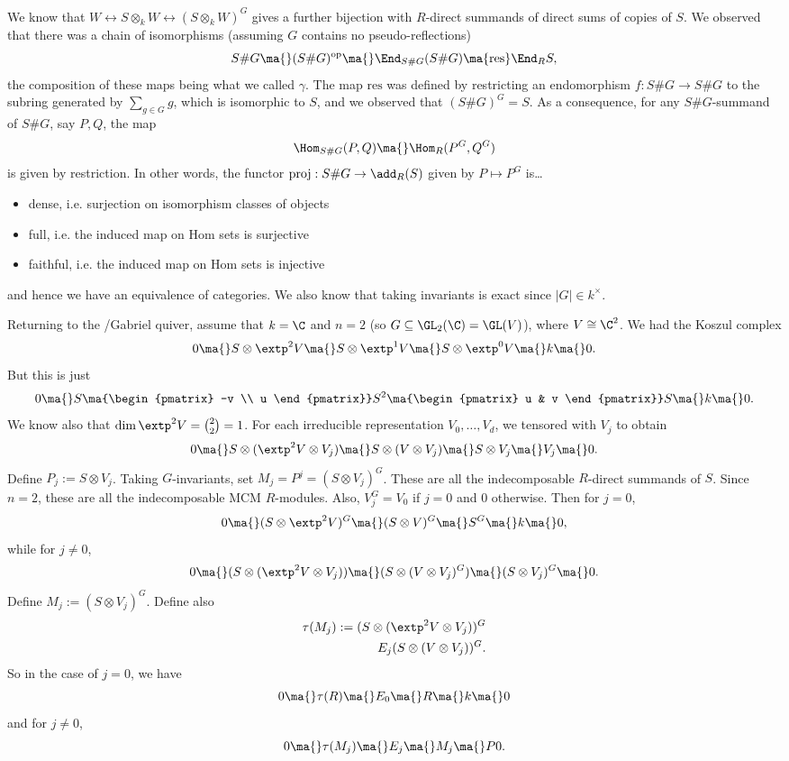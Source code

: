 We know that $W \leftrightarrow S \otimes_k W \leftrightarrow (S \otimes_k W)^G$ gives a further bijection with $R$-direct summands of direct sums of copies of $S$. We observed that there was a chain of isomorphisms (assuming $G$ contains no pseudo-reflections)
	\[
	S\#G \ma{} (S\#G)^{\text{op}} \ma{} \End_{S\#G}(S\#G) \ma{\text{res}} \End_R S,
	\]
the composition of these maps being what we called $\gamma$. The map $\text{res}$ was defined by restricting an endomorphism $f: S\#G \to S\#G$ to the subring generated by $\sum_{g \in G} g$, which is isomorphic to $S$, and we observed that $(S\#G)^G= S$. As a consequence, for any $S\#G$-summand of $S\#G$, say $P,Q$, the map
	\[
	\Hom_{S\#G}(P,Q) \ma{} \Hom_R(P^G,Q^G)
	\]
is given by restriction. In other words, the functor $\text{proj}: S\#G \to \add_R(S)$ given by $P \mapsto P^G$ is\dots
	\begin{itemize}
	\item dense, i.e. surjection on isomorphism classes of objects
	\item full, i.e. the induced map on Hom sets is surjective
	\item faithful, i.e. the induced map on Hom sets is injective
	\end{itemize}
and hence we have an equivalence of categories. We also know that taking invariants is exact since $|G| \in k^\times$. 


Returning to the \mc/Gabriel quiver, assume that $k= \C$ and $n=2$ (so $G \subseteq \GL_2(\C)= \GL(V)$), where $V \cong \C^2$. We had the Koszul complex
	\[
	0 \ma{} S \otimes \extp^2 V \ma{} S \otimes \extp^1 V \ma{} S \otimes \extp^0 V \ma{} k \ma{} 0.
	\]
But this is just
	\[
	0 \ma{} S \ma{\begin{pmatrix} -v \\ u \end{pmatrix}} S^2 \ma{\begin{pmatrix} u & v \end{pmatrix}} S \ma{} k \ma{} 0.
	\]
We know also that $\dim \extp^2 V= \binom{2}{2}=1$. For each irreducible representation $V_0, \ldots, V_d$, we tensored with $V_j$ to obtain
	\[
	0 \ma{} S \otimes (\extp^2 V \otimes V_j) \ma{} S \otimes (V \otimes V_j) \ma{} S \otimes V_j \ma{} V_j \ma{}0.
	\]
Define $P_j:= S \otimes V_j$. Taking $G$-invariants, set $M_j= P^j= (S \otimes V_j)^G$. These are all the indecomposable $R$-direct summands of $S$. Since $n=2$, these are all the indecomposable MCM $R$-modules. Also, $V_j^G= V_0$ if $j=0$ and 0 otherwise. Then for $j=0$,
	\[
	0 \ma{} (S \otimes \extp^2 V)^G \ma{} (S \otimes V)^G \ma{} S^G \ma{} k \ma{} 0,
	\]
while for $j \neq 0$,	
	\[
	0 \ma{} (S \otimes (\extp^2 V \otimes V_j)) \ma{} (S \otimes (V \otimes V_j)^G) \ma{} (S \otimes V_j)^G \ma{} 0.
	\]
Define $M_j:= (S \otimes V_j)^G$. Define also
	\[
	\begin{split}
	\tau(M_j):= (S \otimes (\extp^2 V \otimes V_j))^G \\
	E_j(S \otimes (V \otimes V_j))^G.
	\end{split}
	\]
So in the case of $j=0$, we have
	\[
	0 \ma{} \tau(R) \ma{} E_0 \ma{} R \ma{} k \ma{} 0
	\]
and for $j \neq 0$,
	\[
	0 \ma{} \tau(M_j) \ma{} E_j \ma{} M_j \ma{} P 0. 
	\]


